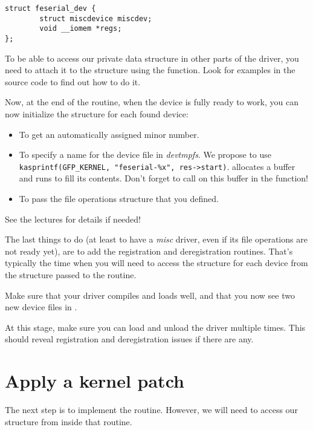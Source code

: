 \begin{verbatim}
struct feserial_dev {
        struct miscdevice miscdev;
        void __iomem *regs;
};
\end{verbatim}

To be able to access our private data structure in other parts of the
driver, you need to attach it to the  structure using the
 function. Look for examples in the
source code to find out how to do it.

Now, at the end of the  routine, when the device is fully ready
to work, you can now initialize the  structure
for each found device:

\begin{itemize}
\item To get an automatically assigned minor number.
\item To specify a name for the device file in {\em devtmpfs}. We
  propose to use {\tt kasprintf(GFP\_KERNEL,
    "feserial-\%x", res->start)}.  allocates a buffer
    and runs  to fill its contents.  Don't forget to
    call  on this buffer in the 
    function!
\item To pass the file operations structure that you defined.
\end{itemize}

See the lectures for details if needed!

The last things to do (at least to have a {\em misc} driver, even if 
its file operations are not ready yet), are to add the registration and
deregistration routines. That's typically the time when you will need
to access the  structure for each device from the
 structure passed to the  routine.

Make sure that your driver compiles and loads well, and that you
now see two new device files in .

At this stage, make sure you can load and unload the driver multiple
times. This should reveal registration and deregistration issues if
there are any.

\section{Apply a kernel patch}

The next step is to implement the  routine. However, we
will need to access our  structure from inside that
routine. 

